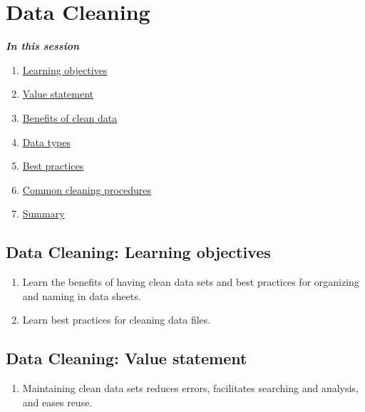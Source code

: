 \documentclass[
]{book}
\providecommand{\tightlist}{%
  \setlength{\itemsep}{0pt}\setlength{\parskip}{0pt}}
\begin{document}
\hypertarget{data-cleaning}{%
\section{Data Cleaning}\label{data-cleaning}}

\textbf{\emph{In this session }}

\begin{enumerate}
\def\labelenumi{\arabic{enumi}.}
\tightlist
\item
  \protect\hyperlink{data-cleaning-learning-objectives}{Learning objectives}
\item
  \protect\hyperlink{data-cleaning-value-statement}{Value statement}
\item
  \protect\hyperlink{benefits-of-clean-data}{Benefits of clean data}
\item
  \protect\hyperlink{data-types}{Data types}
\item
  \protect\hyperlink{data-cleaning-best-practices}{Best practices}
\item
  \protect\hyperlink{common-cleaning-procedures}{Common cleaning procedures}
\item
  \protect\hyperlink{data-cleaning-summary}{Summary}
\end{enumerate}

\hypertarget{data-cleaning-learning-objectives}{%
\subsection{Data Cleaning: Learning objectives}\label{data-cleaning-learning-objectives}}

\begin{enumerate}
\def\labelenumi{\arabic{enumi}.}
\item
  Learn the benefits of having clean data sets and best practices for organizing and naming in data sheets.
\item
  Learn best practices for cleaning data files.
\end{enumerate}

\hypertarget{data-cleaning-value-statement}{%
\subsection{Data Cleaning: Value statement}\label{data-cleaning-value-statement}}

\begin{enumerate}
\def\labelenumi{\arabic{enumi}.}
\tightlist
\item
  Maintaining clean data sets reduces errors, facilitates searching and analysis, and eases reuse.
\end{enumerate}
\end{document}
